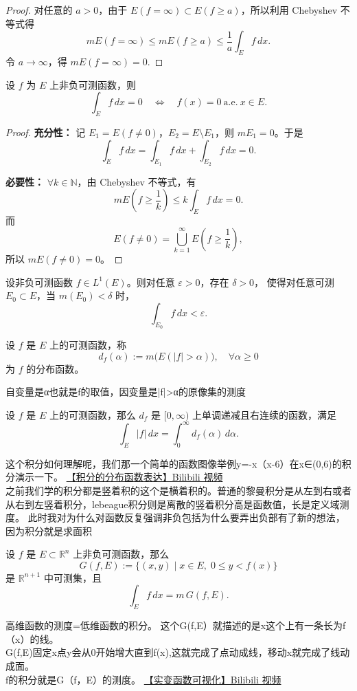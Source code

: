 \documentclass[lang=cn,10pt]{elegantbook}
\begin{document}
\begin{proof}
对任意的 $a>0$，由于 $E(f = \infty) \subset E(f \ge a)$，所以利用 Chebyshev 不等式得
\[
mE(f = \infty) \le mE(f \ge a) \le \frac{1}{a} \int_E f \, dx.
\]
令 $a \to \infty$，得 $mE(f = \infty) = 0$.
\end{proof}
\begin{theorem}[非负函数积分为零的条件]
设 $f$ 为 $E$ 上非负可测函数，则
\[
\int_E f\, dx = 0 \quad \Longleftrightarrow \quad f(x) = 0 \ \text{a.e.} \ x \in E.
\]
\end{theorem}

\begin{proof}
\textbf{充分性：} 记 $E_1 = E(f \neq 0)$，$E_2 = E \setminus E_1$，则 $mE_1 = 0$。于是
\[
\int_E f\, dx = \int_{E_1} f\, dx + \int_{E_2} f\, dx = 0.
\]

\textbf{必要性：} $\forall k \in \mathbb{N}$，由 Chebyshev 不等式，有
\[
mE\left( f \ge \frac{1}{k} \right) \le 
k \int_E f\, dx = 0.
\]
而
\[
E(f \neq 0) = \bigcup_{k=1}^\infty E\left( f \ge \frac{1}{k} \right),
\]
所以 $mE(f \neq 0) = 0$。
\end{proof}
\begin{theorem}[积分的绝对连续性]
设非负可测函数 $f\in L^1(E)$。则对任意 $\varepsilon>0$，存在 $\delta>0$，
使得对任意可测 $E_0\subset E$，当 $m(E_0)<\delta$ 时，
\[
\int_{E_0} f\,dx < \varepsilon .
\]
\end{theorem}

\begin{definition}[分布函数]
设 $f$ 是 $E$ 上的可测函数，称
\[
d_f(\alpha) := m\big(E(|f| > \alpha)\big), \quad \forall \alpha \ge 0
\]
为 $f$ 的分布函数。
\end{definition}
自变量是α也就是f的取值，因变量是|f|>α的原像集的测度
\begin{theorem}[积分的分布函数表达]
设 $f$ 是 $E$ 上的可测函数，那么 $d_f$ 是 $[0, \infty)$ 上单调递减且右连续的函数，满足
\[
\int_E |f|\, dx = \int_{0}^{\infty} d_f(\alpha) \, d\alpha.
\tag{4.2.4}
\]
\end{theorem}
这个积分如何理解呢，我们那一个简单的函数图像举例y=-x（x-6）在x∈(0,6)的积分演示一下。
\href{https://www.bilibili.com/video/BV1CybKzmEWN}{【积分的分布函数表达】Bilibili 视频}\\
之前我们学的积分都是竖着积的这个是横着积的。普通的黎曼积分是从左到右或者从右到左竖着积分，lebeague积分则是离散的竖着积分高是函数值，长是定义域测度。
此时我对为什么对函数反复强调非负包括为什么要弄出负部有了新的想法，因为积分就是求面积\\
\begin{theorem}[4.2.8]
设 $f$ 是 $E \subset \mathbb{R}^n$ 上非负可测函数，那么
\[
G(f,E) := \{ (x,y) \mid x \in E, \; 0 \le y < f(x) \}
\]
是 $\mathbb{R}^{n+1}$ 中可测集，且
\[
\int_E f \, dx = m \, G(f,E) .
\]
\end{theorem}
高维函数的测度=低维函数的积分。
这个G(f,E）就描述的是x这个上有一条长为f（x）的线。\\
G(f,E)固定x点y会从0开始增大直到f(x),这就完成了点动成线，移动x就完成了线动成面。\\
f的积分就是G（f，E）的测度。
\href{https://www.bilibili.com/video/BV1aAb5zUET4}{【实变函数可视化】Bilibili 视频}
\end{document}
